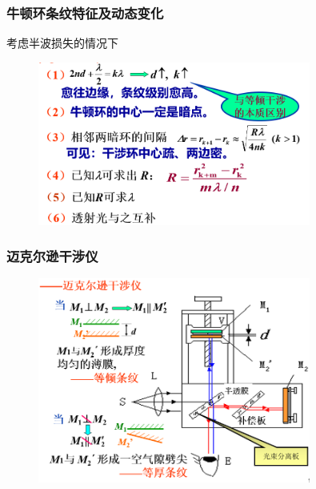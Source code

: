\documentclass[UTF8]{ctexbeamer}
\begin{document}
\begin{frame}
	\frametitle{牛顿环条纹特征及动态变化}
	考虑半波损失的情况下
	\begin{figure}[!ht]
		\centering
		\includegraphics[width=0.8\textwidth]{23}
	\end{figure}
\end{frame}
\begin{frame}
\frametitle{迈克尔逊干涉仪}
	\begin{figure}[!ht]
	\centering
	\includegraphics[width=0.8\textwidth]{30}
\end{figure}
\end{frame}
\end{document}
